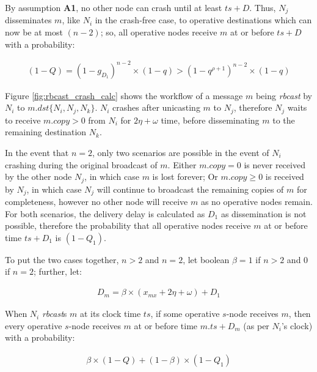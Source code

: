 By assumption \textbf{A1}, no other node can crash until at least $ts+D$. Thus, $N_j$ disseminates $m$, like $N_i$ in the crash-free case, to operative destinations which can now be at most $(n-2)$; so, all operative nodes receive $m$ at or before $ts +D$ with a probability: 
        
        \begin{equation*}
		    \begin{aligned}
		        (1-Q) = (1-g_{D_1})^{n-2}\times (1-q)>(1-q^{\rho+1})^{n-2}\times(1-q)
		    \end{aligned}
		\end{equation*}

Figure \ref{fig:rbcast_crash_calc} shows the workflow of a message $m$ being \emph{rbcast} by $N_i$ to $m.dst \{N_i, N_j, N_k\}$.  $N_i$ crashes after unicasting $m$ to $N_j$, therefore $N_j$ waits to receive $m.copy > 0$ from $N_i$ for $2\eta + \omega$ time, before disseminating $m$ to the remaining destination $N_k$.  

In the event that $n = 2$, only two scenarios are possible in the event of $N_i$ crashing during the original broadcast of $m$.  Either $m.copy = 0$ is never received by the other node $N_j$, in which case $m$ is lost forever; Or $m.copy \geq 0$ is received by $N_j$, in which case $N_j$ will continue to broadcast the remaining copies of $m$ for completeness, however no other node will receive $m$ as no operative nodes remain.  For both scenarios, the delivery delay is calculated as $D_1$ as dissemination is not possible, therefore the probability that all operative nodes receive $m$ at or before time $ts+D_1$ is $(1-Q_1)$.  

To put the two cases together, $n > 2$ and $n = 2$, let boolean $\beta = 1$ if $n>2$ and $0$ if $n=2$; further, let: 

        \begin{equation*}
		    \begin{aligned}
		        D_m=\beta\times(x_{mx}+2\eta+\omega)+D_1
		    \end{aligned}
		\end{equation*}
		
When $N_i$ \emph{rbcast}s $m$ at its clock time $ts$, if some operative $s$-node receives $m$, then every operative $s$-node receives $m$ at or before time $m.ts+D_m$ (as per $N_i$'s clock) with a probability:

         \begin{equation*}
		    \begin{aligned}
		        \beta\times(1-Q)+(1-\beta)\times(1-Q_1)
		    \end{aligned}
		\end{equation*}

